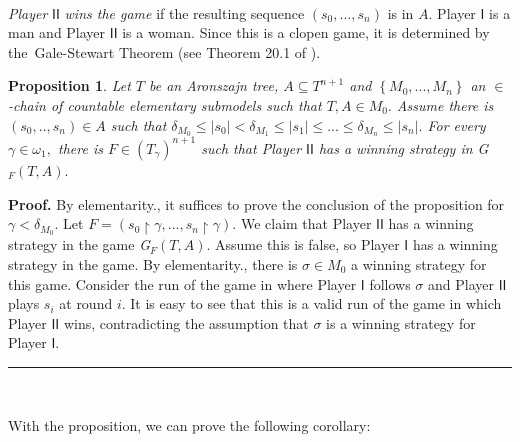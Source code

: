 \documentclass{article}
\newtheorem{proposition}[theorem]{Proposition}
\newenvironment{proof}[1][Proof]{\noindent\textbf{#1.} }{\ \rule{0.5em}{0.5em}}
\begin{document}
\qquad\ \ \ \qquad\ \ 

\emph{Player} $\mathsf{II}$ \emph{wins the game }if the resulting
sequence\emph{ }$\left(  s_{0},...,s_{n}\right)  $ is in $A.$ Player
$\mathsf{I}$ is a man and Player $\mathsf{II}$ is a woman. Since this is a
clopen game, it is determined by the\ Gale-Stewart Theorem (see Theorem 20.1
of \cite{Kechris}).

\begin{proposition}
Let $T$ be an Aronszajn tree, $A\subseteq T^{n+1}$ and $\left\{
M_{0},...,M_{n}\right\}  $ an $\in$-chain of countable elementary submodels
such that $T,A\in M_{0}.$ Assume there is $\left(  s_{0},..,s_{n}\right)  \in
A$ such that $\delta_{M_{0}}\leq\left\vert s_{0}\right\vert <\delta_{M_{1}%
}\leq\left\vert s_{1}\right\vert \leq...\leq\delta_{M_{n}}\leq\left\vert
s_{n}\right\vert .$ For every $\gamma\in\omega_{1},$ there is $F\in\left(
T_{\gamma}\right)  ^{n+1}$ such that Player $\mathsf{II}$ has a winning
strategy in \emph{G}$_{F}\left(  T,A\right)  .$
\end{proposition}

\begin{proof}
By elementarity., it suffices to prove the conclusion of the proposition for
$\gamma<\delta_{M_{0}}.$ Let $F=\left(  s_{0}\upharpoonright\gamma
,...,s_{n}\upharpoonright\gamma\right)  .$ We claim that Player $\mathsf{II}$
has a winning strategy in the game \emph{G}$_{F}\left(  T,A\right)  .$ Assume
this is false, so Player $\mathsf{I}$ has a winning strategy in the game. By
elementarity., there is $\sigma\in M_{0}$ a winning strategy for this game.
Consider the run of the game in where Player $\mathsf{I}$ follows $\sigma$ and
Player $\mathsf{II}$ plays $s_{i}$ at round $i.$ It is easy to see that this
is a valid run of the game in which Player $\mathsf{II}$ wins, contradicting
the assumption that $\sigma$ is a winning strategy for Player $\mathsf{I.}$
\end{proof}

\qquad\ \qquad\ \ 

With the proposition, we can prove the following corollary:
\end{document}
